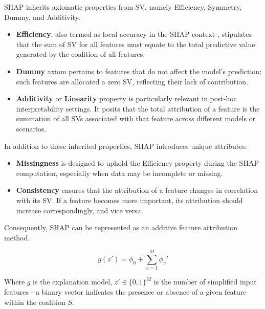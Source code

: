 SHAP  inherits axiomatic properties from SV, namely Efficiency, Symmetry, Dummy, and Additivity.

\begin{itemize}
    \item \textbf{Efficiency}, also termed as local accuracy in the SHAP context \cite{10.5555/3295222.3295230}, stipulates that the sum of SV for all features must equate to the total predictive value generated by the coalition of all features.
  
    \item \textbf{Dummy} axiom pertains to features that do not affect the model's prediction; such features are allocated a zero SV, reflecting their lack of contribution.

    \item \textbf{Additivity} or \textbf{Linearity} property is particularly relevant in post-hoc interpretability settings. It posits that the total attribution of a feature is the summation of all SVs associated with that feature across different models or scenarios.
\end{itemize}

In addition to these inherited properties, SHAP introduces unique attributes:

\begin{itemize}
    \item \textbf{Missingness} is designed to uphold the Efficiency property during the SHAP computation, especially when data may be incomplete or missing.
  
    \item \textbf{Consistency} ensures that the attribution of a feature changes in correlation with its SV. If a feature becomes more important, its attribution should increase correspondingly, and vice versa.
\end{itemize}

Consequently, SHAP can be represented as an additive feature attribution method.

\begin{equation}
g(z')=\phi_0+\sum_{v=1}^M\phi_v'
\end{equation}

Where $g$ is the explanation model, $z'\in\{0,1\}^M$ is the number of simplified input features - a binary vector indicates the presence or absence of a given feature within the coalition $S$.



